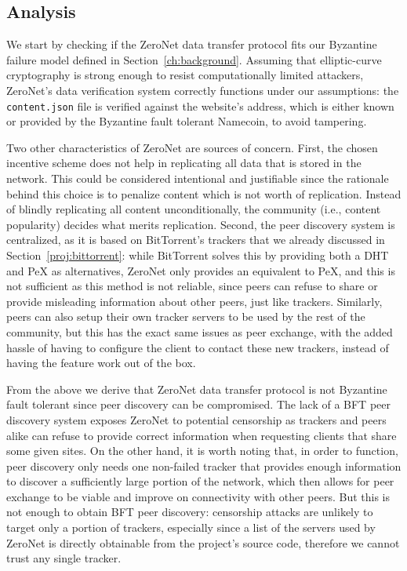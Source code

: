 \documentclass[mscthesis]{usiinfthesis}
\begin{document}
\subsection{Analysis}

We start by checking if the ZeroNet data transfer protocol fits our Byzantine failure model defined in Section~\ref{ch:background}. Assuming that elliptic-curve cryptography is strong enough to resist computationally limited attackers, ZeroNet's data verification system correctly functions under our assumptions: the \texttt{content.json} file is verified against the website's address, which is either known or provided by the Byzantine fault tolerant Namecoin, to avoid tampering.

Two other characteristics of ZeroNet are sources of concern. First, the chosen incentive scheme does not help in replicating all data that is stored in the network.
This could be considered intentional and justifiable since the rationale behind this choice is to penalize content which is not worth of replication. Instead of blindly replicating all content unconditionally, the community (i.e., content popularity) decides what merits replication. Second, the peer discovery system is centralized, as it is based on BitTorrent's trackers that we already discussed in Section~\ref{proj:bittorrent}: while BitTorrent solves this by providing both a DHT and PeX as alternatives, ZeroNet only provides an equivalent to PeX, and this is not sufficient as this method is not reliable, since peers can refuse to share or provide misleading information about other peers, just like trackers. Similarly, peers can also setup their own tracker servers to be used by the rest of the community, but this has the exact same issues as peer exchange, with the added hassle of having to configure the client to contact these new trackers, instead of having the feature work out of the box.

From the above we derive that ZeroNet data transfer protocol is not Byzantine fault tolerant since peer discovery can be compromised. The lack of a BFT peer discovery system exposes ZeroNet to potential censorship as trackers and peers alike can refuse to provide correct information when requesting clients that share some given sites. On the other hand, it is worth noting that, in order to function, peer discovery only needs one non-failed tracker that provides enough information to discover a sufficiently large portion of the network, which then allows for peer exchange to be viable and improve on connectivity with other peers. But this is not enough to obtain BFT peer discovery: censorship attacks are unlikely to target only a portion of trackers, especially since a list of the servers used by ZeroNet is directly obtainable from the project's source code, therefore we cannot trust any single tracker.
\end{document}
